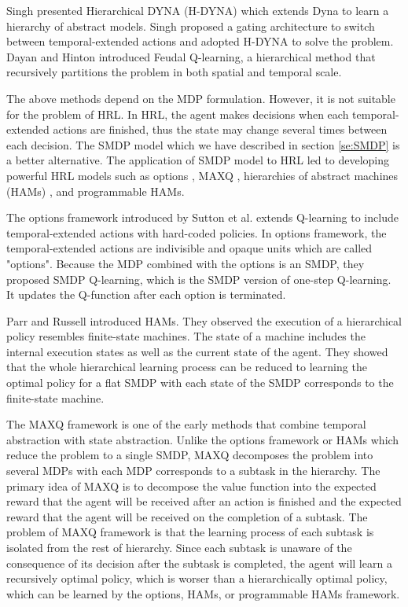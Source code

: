 Singh \cite{Singh92} presented Hierarchical DYNA (H-DYNA) which extends Dyna
to learn a hierarchy of abstract models. Singh proposed a gating architecture to switch 
between temporal-extended actions and adopted H-DYNA to solve the problem. 
Dayan and Hinton \cite{Dayan95} introduced Feudal Q-learning, a hierarchical method that
recursively partitions the problem in both spatial and temporal scale. 

The above methods depend on the MDP formulation. However, it is not suitable for the problem of HRL.
In HRL, the agent makes decisions when each temporal-extended actions are finished, thus the state
may change several times between each decision. The SMDP model which we have described
in section \ref{se:SMDP} is a better alternative. The application of SMDP model
to HRL led to developing powerful HRL models such as options \cite{SMDP},
MAXQ \cite{MaxQJ}, hierarchies of abstract machines (HAMs) \cite{HAMQ}, and 
programmable HAMs\cite{HORDQ}.

The options framework introduced by Sutton et al. \cite{SMDP} extends
Q-learning to include temporal-extended actions with hard-coded policies.
In options framework, the temporal-extended actions are indivisible and opaque units which are called "options".
Because the MDP combined with the options is an SMDP, they proposed SMDP Q-learning, which is
the SMDP version of one-step Q-learning. It updates the Q-function after each option is terminated.

Parr and Russell \cite{HAMQ} introduced HAMs. They observed the execution of a hierarchical policy
resembles finite-state machines. The state of a machine includes the internal execution states as well as
the current state of the agent. They showed that the whole hierarchical learning process can be reduced to
learning the optimal policy for a flat SMDP with each state of the SMDP corresponds to the finite-state machine.

The MAXQ framework is one of the early methods that combine temporal abstraction with state abstraction.
Unlike the options framework or HAMs which reduce the problem to a single SMDP, MAXQ decomposes
the problem into several MDPs with each MDP corresponds to a subtask in the hierarchy.
The primary idea of MAXQ is to decompose the value function into the expected reward that
the agent will be received after an action is finished and the expected reward that
the agent will be received on the completion of a subtask. 
The problem of MAXQ framework is that the learning process of each subtask 
is isolated from the rest of hierarchy. Since each subtask is unaware
of the consequence of its decision after the subtask is completed, 
the agent will learn a recursively optimal policy, which is worser than
a hierarchically optimal policy, which can be learned by the options, HAMs, or programmable HAMs framework.


